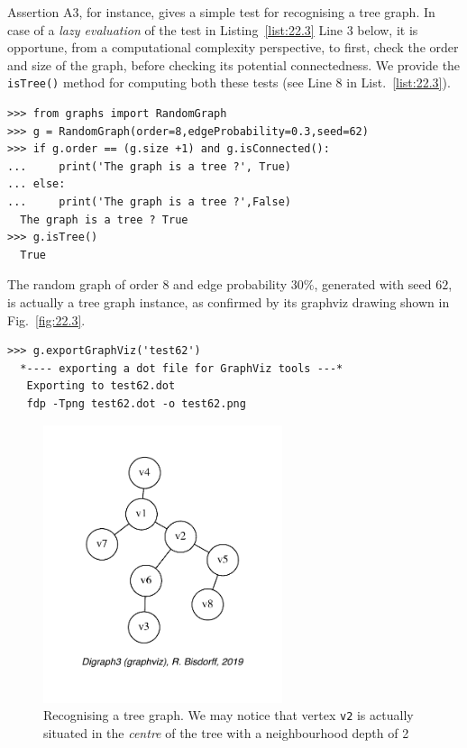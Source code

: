 Assertion A3, for instance, gives a simple test for recognising a tree graph. In case of a \emph{lazy evaluation} of the test in Listing~\vref{list:22.3} Line 3 below, it is opportune, from a computational complexity perspective, to first, check the order and size of the graph, before checking its potential connectedness. We provide the \texttt{isTree()} method for computing both these tests (see Line 8 in List.~\vref{list:22.3}).
\begin{lstlisting}[caption={Recognizing a tree graph.},label=list:22.3]
>>> from graphs import RandomGraph
>>> g = RandomGraph(order=8,edgeProbability=0.3,seed=62)
>>> if g.order == (g.size +1) and g.isConnected():
...     print('The graph is a tree ?', True)
... else:
...     print('The graph is a tree ?',False)   
  The graph is a tree ? True
>>> g.isTree()
  True  
\end{lstlisting}
The random graph of order $8$ and edge probability $30\%$, generated with seed $62$, is actually a tree graph instance, as confirmed by its graphviz drawing shown in Fig.~\vref{fig:22.3}.
\begin{lstlisting}
>>> g.exportGraphViz('test62')
  *---- exporting a dot file for GraphViz tools ---*
   Exporting to test62.dot
   fdp -Tpng test62.dot -o test62.png
\end{lstlisting}
\begin{figure}[ht]
\sidecaption[t]
\includegraphics[width=7cm]{Figures/22-3-test62.pdf}
\caption[Recognising a tree graph]{Recognising a tree graph. We may notice that vertex \texttt{v2} is actually situated in the \emph{centre} of the tree with a neighbourhood depth of 2} 
\label{fig:22.3}       %
\end{figure}

